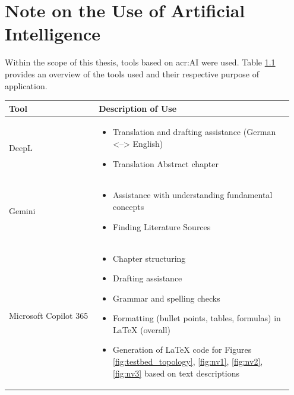 \chapter{Note on the Use of Artificial Intelligence}

Within the scope of this thesis, tools based on \gls{acr:AI} were used. Table \ref{tab:anhang_uebersicht_KI_werkzeuge} provides an overview of the tools used and their respective purpose of application.

\begin{table}[hbt]	
	\centering
	\renewcommand{\arraystretch}{1.5}	%
	\label{tab:anhang_uebersicht_KI_werkzeuge}
	\begin{tabular}{>{\raggedright\arraybackslash}p{0.3\linewidth} >{\raggedright\arraybackslash}p{0.65\linewidth}}
		\textbf{Tool} & \textbf{Description of Use}\\
		\hline 
		\hline
		DeepL	&	\vspace{-\topsep}
		\begin{itemize}[noitemsep,topsep=0pt,partopsep=0pt,parsep=0pt] 
			\item Translation and drafting assistance (German <--> English)
			\item Translation Abstract chapter
		\end{itemize} \\ 
		Gemini	&	\vspace{-\topsep}
		\begin{itemize}[noitemsep,topsep=0pt,partopsep=0pt,parsep=0pt] 
			\item Assistance with understanding fundamental concepts
			\item Finding Literature Sources
		\end{itemize} \\ 
		Microsoft Copilot 365	&	\vspace{-\topsep}
		\begin{itemize}[noitemsep,topsep=0pt,partopsep=0pt,parsep=0pt] 
			\item Chapter structuring
			\item Drafting assistance
			\item Grammar and spelling checks
			\item Formatting (bullet points, tables, formulas) in LaTeX (overall)
			\item Generation of LaTeX code for Figures \ref{fig:testbed_topology}, \ref{fig:nv1},  \ref{fig:nv2}, \ref{fig:nv3} based on text descriptions

\end{itemize}
\end{tabular}
\end{table}
